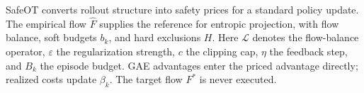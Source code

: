 SafeOT converts rollout structure into safety prices for a standard policy update. The empirical flow $\widehat F$ supplies the reference for entropic projection, with flow balance, soft budgets $b_k$, and hard exclusions $H$. Here $\mathcal L$ denotes the flow-balance operator, $\varepsilon$ the regularization strength, $c$ the clipping cap, $\eta$ the feedback step, and $B_k$ the episode budget. GAE advantages enter the priced advantage directly; realized costs update $\beta_k$. The target flow $F^*$ is never executed.